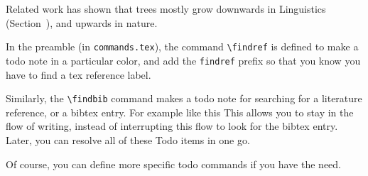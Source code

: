 Related work has shown that trees mostly grow downwards in Linguistics (Section~), and upwards in nature. 

In the preamble (in \texttt{commands.tex}), the command \texttt{\textbackslash findref} is defined to make a todo note in a particular color, and add the \texttt{findref} prefix so that you know you have to find a tex reference label. 

Similarly, the \texttt{\textbackslash findbib} command makes a todo note for searching for a literature reference, or a bibtex entry. For example like this  
This allows you to stay in the flow of writing, instead of interrupting this flow to look for the bibtex entry. Later, you can resolve all of these Todo items in one go. 

Of course, you can define more specific todo commands if you have the need. 

